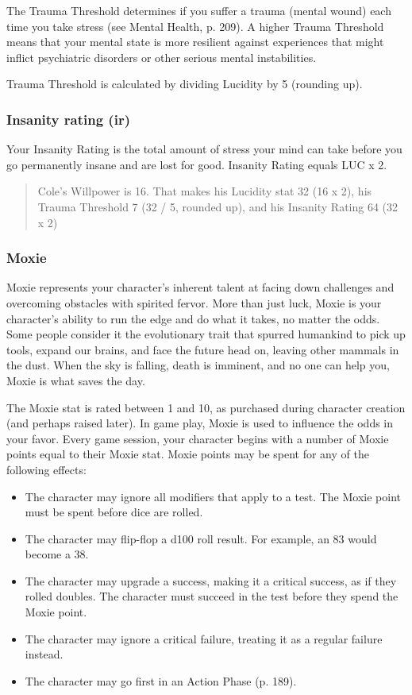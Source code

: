 The Trauma Threshold determines if you suffer a trauma (mental wound)
each time you take stress (see Mental Health, p. 209). A higher Trauma
Threshold means that your mental state is more resilient against
experiences that might inflict psychiatric disorders or other serious
mental instabilities.

Trauma Threshold is calculated by dividing Lucidity by 5 (rounding
up).

\subsubsection{Insanity rating (ir)}
\label{sec:insanity-rating-ir}

Your Insanity Rating is the total amount of stress your mind can take
before you go permanently insane and are lost for good. Insanity
Rating equals LUC x 2.

\begin{quotation}
  Cole's Willpower is 16. That makes his Lucidity stat 32 (16 x 2),
  his Trauma Threshold 7 (32 / 5, rounded up), and his Insanity Rating
  64 (32 x 2)
\end{quotation}

\subsubsection{Moxie}
\label{sec:moxie}

Moxie represents your character's inherent talent at facing down
challenges and overcoming obstacles with spirited fervor. More than
just luck, Moxie is your character's ability to run the edge and do
what it takes, no matter the odds. Some people consider it the
evolutionary trait that spurred humankind to pick up tools, expand our
brains, and face the future head on, leaving other mammals in the
dust. When the sky is falling, death is imminent, and no one can help
you, Moxie is what saves the day.

The Moxie stat is rated between 1 and 10, as purchased during
character creation (and perhaps raised later). In game play, Moxie is
used to influence the odds in your favor. Every game session, your
character begins with a number of Moxie points equal to their Moxie
stat. Moxie points may be spent for any of the following effects:

\begin{itemize}
\item The character may ignore all modifiers that apply to a test. The
  Moxie point must be spent before dice are rolled.
\item The character may flip-flop a d100 roll result. For example, an
  83 would become a 38.
\item The character may upgrade a success, making it a critical
  success, as if they rolled doubles. The character must succeed in
  the test before they spend the Moxie point.
\item The character may ignore a critical failure, treating it as a
  regular failure instead.
\item The character may go first in an Action Phase (p. 189).
\end{itemize}

